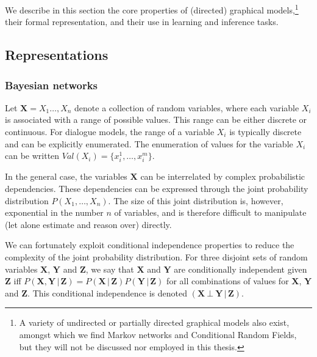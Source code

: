 We describe in this section the core properties of (directed) graphical models,\footnote{A variety of undirected or partially directed graphical models also exist, amongst which we find Markov networks and Conditional Random Fields, but they will not be discussed nor employed in this thesis.} their formal representation, and their use in learning and inference tasks. 
 
 \subsection{Representations}
 \label{sec:gm-representation}
\subsubsection*{Bayesian networks}

Let $\mathbf{X} = X_1 \dots, X_n$ denote a collection of random variables, where each variable $X_i$ is associated with a range of possible values.  This range can be either discrete or continuous.  For dialogue models, the range of a variable $X_i$ is typically discrete and can be explicitly enumerated. The enumeration of values for the variable $X_i$ can be written $\mathit{Val}(X_i) = \{x_i^1, \dots, x_i^m\}$.  

In the general case, the variables $\mathbf{X}$ can be interrelated by complex probabilistic dependencies.  These dependencies can be expressed through the joint probability distribution $P(X_1, \dots, X_n)$.  The size of this joint distribution is, however,  exponential in the number $n$ of variables, and is therefore difficult to manipulate (let alone estimate and reason over) directly. 

We can fortunately exploit conditional independence properties to reduce the complexity of the joint probability distribution.  For three disjoint sets of random variables $\mathbf{X}$, $\mathbf{Y}$ and $\mathbf{Z}$, we say that $\mathbf{X}$ and $\mathbf{Y}$ are conditionally independent given $\mathbf{Z}$ iff $P(\mathbf{X},\mathbf{Y} \, | \, \mathbf{Z}) = P(\mathbf{X} \, | \, \mathbf{Z}) P(\mathbf{Y} \, | \, \mathbf{Z})$ for all combinations of values for  $\mathbf{X}$, $\mathbf{Y}$ and  $\mathbf{Z}$. This conditional independence is denoted $(\mathbf{X} \ \bot \  \mathbf{Y} \, | \,  \mathbf{Z})$. 

